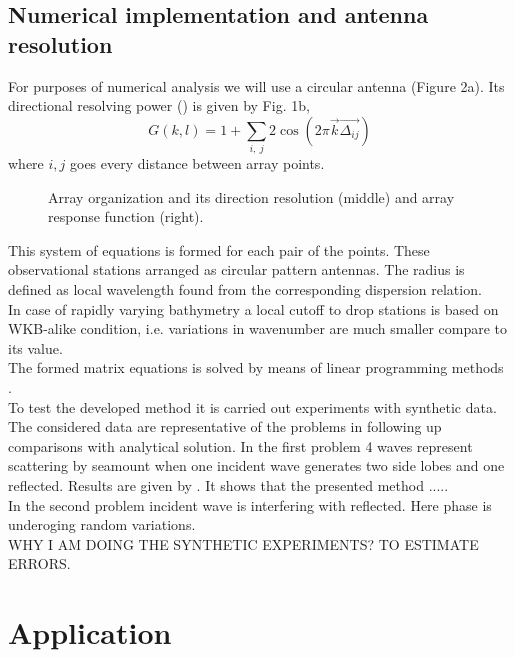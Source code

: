 \subsection{Numerical implementation and antenna resolution}
For purposes of numerical analysis we will use a circular antenna (Figure 2a). Its directional resolving power (\cite{barber1963directional}) is given by Fig. 1b,
\begin{equation}
G(k,l) = 1 + \sum_{i,~j} 2\cos(2\pi \vec{k} \vec{\Delta_{ij}})
\end{equation}
where $i,j$ goes every distance between array points.\\
\begin{figure}
\caption{Array organization and its direction resolution (middle) and array response function (right).}
\end{figure}
This system of equations is formed for each pair of the points. These observational stations arranged as circular pattern antennas. The radius is defined as local wavelength found from the corresponding dispersion relation.\\
In case of rapidly varying bathymetry a local cutoff to drop stations is based on WKB-alike condition, i.e. variations in wavenumber are much smaller compare to its value.\\
The formed matrix equations is solved by means of linear programming methods \cite{haskell1981algorithm}.\\
To test the developed method it is carried out experiments with synthetic data. The considered data are representative of the problems in following up comparisons with analytical solution. In the first problem 4 waves represent scattering by seamount when one incident wave generates two side lobes and one reflected. Results are given by . It shows that the presented method .....\\
In the second problem incident wave is interfering with reflected. Here phase is underoging random variations.\\
WHY I AM DOING THE SYNTHETIC EXPERIMENTS? TO ESTIMATE ERRORS.\\


\section{Application}
